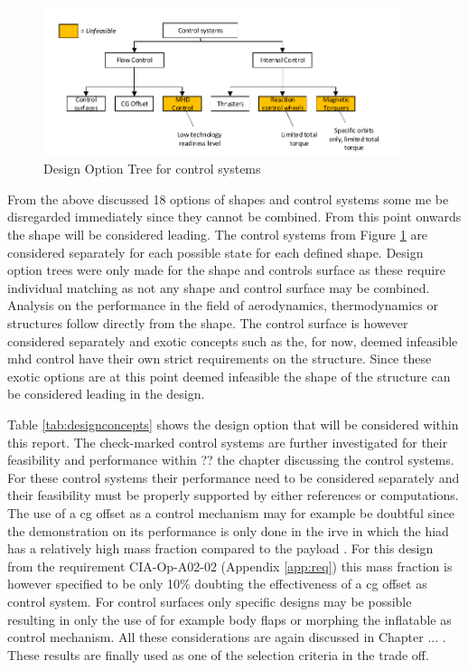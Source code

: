 \begin{figure}[H]
\centering
\includegraphics[width = 0.93\textwidth]{Figure/DOT_control.pdf}
\vspace{-5mm}
\caption{Design Option Tree for control systems}
\label{fig:dotcontrol}
\end{figure}


From the above discussed 18 options of shapes and control systems some me be disregarded immediately since they cannot be combined. From this point onwards the shape will be considered leading. The control systems from Figure \ref{fig:dotcontrol} are considered separately for each possible state for each defined shape. Design option trees were only made for the shape and controls surface as these require individual matching as not any shape and control surface may be combined. Analysis on the performance in the field of aerodynamics, thermodynamics or structures follow directly from the shape. The control surface is however considered separately and exotic concepts such as the, for now, deemed infeasible \gls{mhd} control have their own strict requirements on the structure. Since these exotic options are at this point deemed infeasible the shape of the structure can be considered leading in the design. 

 Table \ref{tab:designconcepts} shows the design option that will be considered within this report. The check-marked control systems are further investigated for their feasibility and performance within ?? the chapter discussing the control systems. For these control systems their performance need to be considered separately and their feasibility must be properly supported by either references or computations. The use of a \gls{cg} offset as a control mechanism may for example be doubtful since the demonstration on its performance is only done in the \gls{irve} in which the \gls{hiad} has a relatively high mass fraction compared to the payload \cite{Dillman2012}. For this design from the requirement CIA-Op-A02-02 (Appendix \ref{app:req}) this mass fraction is however specified to be only 10\% doubting the effectiveness of a \gls{cg} offset as control system. For control surfaces only specific designs may be possible resulting in only the use of for example body flaps or morphing the inflatable as control mechanism. All these considerations are again discussed in Chapter ... . These results are finally used as one of the selection criteria in the trade off.

